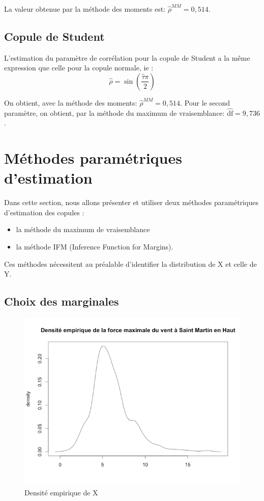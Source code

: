 La valeur obtenue par la méthode des moments est: $\widehat{\rho}^{MM} = 0,514$.

\subsection{Copule de Student}

L'estimation du paramètre de corrélation pour la copule de Student a la même expression que celle pour la copule normale, ie :
$$
\widehat{\rho} = \operatorname{sin}\left(\frac{\widehat{\tau} \pi}{2} \right)
$$

On obtient, avec la méthode des moments: $\widehat{\rho}^{MM} = 0,514$. Pour le second paramètre, on obtient, par la méthode du maximum de vraisemblance: $\widehat{\text{df}} = 9,736$.

\section{Méthodes paramétriques d'estimation}

Dans cette section, nous allons présenter et utiliser deux méthodes paramétriques d'estimation
des copules :

\begin{itemize}
\item la méthode du maximum de vraisemblance
\item la méthode IFM (Inference Function for Margins).
\end{itemize}

Ces méthodes nécessitent au préalable d'identifier la distribution de X et celle de Y.

\subsection{Choix des marginales}

\noindent%
\begin{figure}[H]
    \begin{center}
      \includegraphics[width=12 cm, angle=0]{./pictures/densityx.png}
      \centering\caption{\label{2} Densité empirique de X}
    \end{center}
\end{figure}

